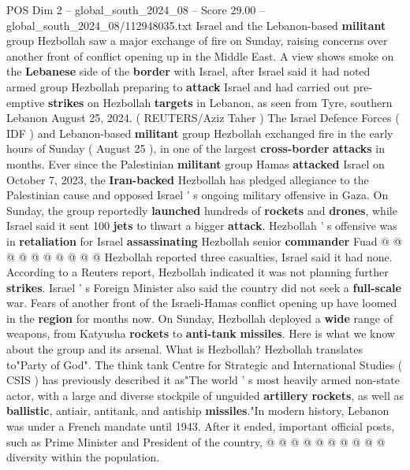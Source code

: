 \begin{textsample}{POS Dim 2 – global\_south\_2024\_08 – Score 29.00 – global\_south\_2024\_08/112948035.txt}  \label{ex:f2_pos_020}
Israel and the Lebanon-based \textbf{militant} group Hezbollah saw a major exchange of fire on Sunday, raising concerns over another front of conflict opening up in the Middle East.
A view shows smoke on the \textbf{Lebanese} side of the \textbf{border} with Israel, after Israel said it had noted armed group Hezbollah preparing to \textbf{attack} Israel and had carried out pre-emptive \textbf{strikes} on Hezbollah \textbf{targets} in Lebanon, as seen from Tyre, southern Lebanon August 25, 2024. ( REUTERS/Aziz Taher ) The Israel Defence Forces ( IDF ) and Lebanon-based \textbf{militant} group Hezbollah exchanged fire in the early hours of Sunday ( August 25 ), in one of the largest \textbf{cross-border} \textbf{attacks} in months.
Ever since the Palestinian \textbf{militant} group Hamas \textbf{attacked} Israel on October 7, 2023, the \textbf{Iran-backed} Hezbollah has pledged allegiance to the Palestinian cause and opposed Israel ' s ongoing military offensive in Gaza.
On Sunday, the group reportedly \textbf{launched} hundreds of \textbf{rockets} and \textbf{drones}, while Israel said it sent 100 \textbf{jets} to thwart a bigger \textbf{attack}.
Hezbollah ' s offensive was in \textbf{retaliation} for Israel \textbf{assassinating} Hezbollah senior \textbf{commander} Fuad @ @ @ @ @ @ @ @ @ @ Hezbollah reported three casualties, Israel said it had none.
According to a Reuters report, Hezbollah indicated it was not planning further \textbf{strikes}.
Israel ' s Foreign Minister also said the country did not seek a \textbf{full-scale} war.
Fears of another front of the Israeli-Hamas conflict opening up have loomed in the \textbf{region} for months now.
On Sunday, Hezbollah deployed a \textbf{wide} range of weapons, from Katyusha \textbf{rockets} to \textbf{anti-tank} \textbf{missiles}.
Here is what we know about the group and its arsenal.
What is Hezbollah?
Hezbollah translates to"Party of God".
The think tank Centre for Strategic and International Studies ( CSIS ) has previously described it as"The world ' s most heavily armed non-state actor, with a large and diverse stockpile of unguided \textbf{artillery} \textbf{rockets}, as well as \textbf{ballistic}, antiair, antitank, and antiship \textbf{missiles}."In modern history, Lebanon was under a French mandate until 1943.
After it ended, important official posts, such as Prime Minister and President of the country, @ @ @ @ @ @ @ @ @ @ diversity within the population.

\end{textsample}
